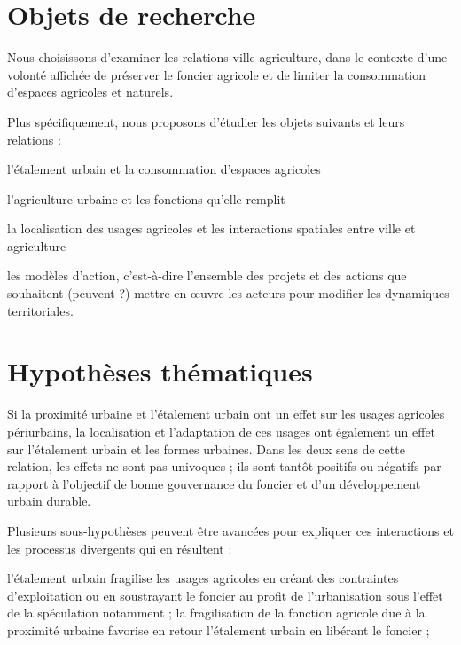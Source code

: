 \section{Objets de recherche}

Nous choisissons d'examiner les relations ville-agriculture,
dans le contexte d'une volonté affichée de préserver le foncier agricole
et de limiter la consommation d'espaces agricoles et naturels.

Plus spécifiquement, nous proposons d'étudier les objets suivants
et leurs relations :

\startitemize[packed]

\item l'étalement urbain et la consommation d'espaces agricoles
\item l'agriculture urbaine et les fonctions qu'elle remplit
\item la localisation des usages agricoles
  et les interactions spatiales entre ville et agriculture
\item les modèles d'action, c'est-à-dire l'ensemble
  des projets et des actions que souhaitent (peuvent ?) mettre en œuvre
  les acteurs pour modifier les dynamiques territoriales.

\stopitemize


\section{Hypothèses thématiques}

\startitemize[n]

\item	Si la proximité urbaine
	et l'étalement urbain ont un effet sur les usages agricoles
	périurbains, la localisation et l'adaptation de ces usages
	ont également un effet sur l'étalement urbain et les formes urbaines.
	Dans les deux sens de cette relation, les effets ne sont pas univoques ;
	ils sont tantôt positifs ou négatifs par rapport à l'objectif de bonne gouvernance
	du foncier et d'un développement urbain durable.

	Plusieurs sous-hypothèses peuvent être avancées
	pour expliquer ces interactions et les processus divergents
	qui en résultent :

	\startitemize[a,packed]

	\item	l'étalement urbain fragilise les usages agricoles
		en créant des contraintes d'exploitation ou
		en soustrayant le foncier au profit de l'urbanisation
		sous l'effet de la spéculation notamment ;
		la fragilisation de la fonction agricole
		due à la proximité urbaine favorise en retour l'étalement urbain
		en libérant le foncier ;


